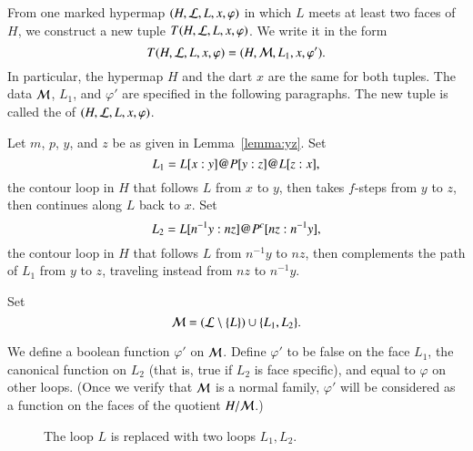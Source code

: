 \begin{definition}[transform]
From one marked hypermap $(H,{\cal L},L,x,\varphi)$ in
which $L$ meets at least two faces of $H$, we construct a new tuple 
$T(H,{\cal L},L,x,\varphi)$.  We write it in the form
\begin{displaymath}
T(H,{\cal L},L,x,\varphi) = (H,{\cal M},L_1,x,\varphi').
\end{displaymath}
In particular, the hypermap $H$ and the dart $x$ are
the same for both tuples.   The data ${\cal M}$, $L_1$, and $\varphi'$ are specified
in the following paragraphs.
The new tuple is called the  of $(H,{\cal L},L,x,\varphi)$.
\end{definition}

Let $m$, $p$, $y$, and $z$ be as given in
Lemma~\ref{lemma:yz}.
Set
\begin{displaymath}
L_1 = L[x:y] {{\operatorname{@}}} P[y:z] {{\operatorname{@}}} L[z:x],
\end{displaymath}
the contour loop in $H$ that follows $L$ from $x$ to $y$, then takes
$f$-steps from $y$ to $z$, then continues along $L$ back to $x$.  
Set 
\begin{displaymath}
L_2 = L[n^{-1}y:n z] {{\operatorname{@}}} P^c[n z:n^{-1}y],
\end{displaymath}
the contour loop in $H$ that follows $L$ from $n^{-1} y$ to $n z$,
then complements the path of $L_1$ from $y$ to $z$, traveling instead
from $n z$ to $n^{-1} y$. 


Set
\begin{displaymath}{\cal M} = ({\cal L}\setminus \{L\}) \cup
\{L_1,L_2\}.\end{displaymath}

We define a boolean function $\varphi'$
on $\cal M$.
Define $\varphi'$ to be false on
the face $L_1$, the canonical function on $L_2$ (that is, true if $L_2$ is face specific), and equal to
$\varphi$ on other loops. (Once we verify that ${\cal M}$ is a
normal family,  $\varphi'$ will be considered as a function on
the faces of the quotient $H/{\cal M}$.)  
%
%




\begin{figure}[htb]
\centering
{}
\caption{The loop $L$ is replaced with two loops $L_1, L_2$.}
\label{fig:L1L2}
\end{figure}



